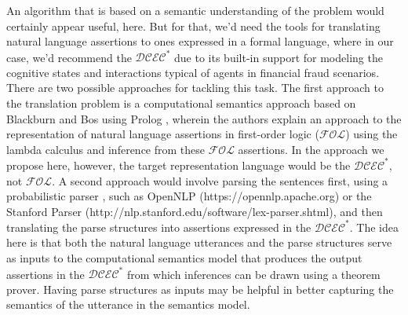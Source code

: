 An algorithm that is based on a semantic understanding of the problem would certainly appear useful, here. But for that, we'd need the tools for translating natural language assertions to ones expressed in a formal language, where in our case, we'd recommend the $\mathcal{DCEC}^\ast$ due to its built-in support for modeling the cognitive states and interactions typical of agents in financial fraud scenarios. There are two possible approaches for tackling this task. The first approach to the translation problem is a computational semantics approach based on Blackburn and Bos \cite{blackburn_2005_representation_ch1, blackburn_2005_representation_ch2, blackburn_2005_representation_ch3, blackburn_2005_representation_ch4, blackburn_2005_representation_ch5, blackburn_2005_representation_ch6} using Prolog \cite{blackburn_2006_prolog_ch1,
blackburn_2006_prolog_ch2,
blackburn_2006_prolog_ch3,
blackburn_2006_prolog_ch4,
blackburn_2006_prolog_ch5,
blackburn_2006_prolog_ch6,
blackburn_2006_prolog_ch7,
blackburn_2006_prolog_ch8,
blackburn_2006_prolog_ch9,
blackburn_2006_prolog_ch10,
blackburn_2006_prolog_ch11,
blackburn_2006_prolog_ch12}, wherein the authors explain an approach to the representation of natural language assertions in first-order logic ($\mathcal{FOL}$) \cite{blackburn_2005_representation_ch1} using the lambda calculus \cite{blackburn_2005_representation_ch2} and inference \cite{blackburn_2005_representation_ch4, blackburn_2005_representation_ch5} from these $\mathcal{FOL}$ assertions. In the approach we propose here, however, the target representation language would be the $\mathcal{DCEC}^\ast$, not $\mathcal{FOL}$.  A second approach would involve parsing the sentences first, using a probabilistic parser \cite{martin_2000_speech_ch14}, such as OpenNLP (https://opennlp.apache.org) or the Stanford Parser (http://nlp.stanford.edu/software/lex-parser.shtml),  and then translating the parse structures into assertions expressed in the $\mathcal{DCEC}^\ast$.  The idea here is that both the natural language utterances and the parse structures serve as inputs to the computational semantics model that produces the output assertions in the $\mathcal{DCEC}^\ast$ from which inferences can be drawn using a theorem prover.  Having parse structures as inputs may be helpful in better capturing the semantics of the utterance in the semantics model. 

